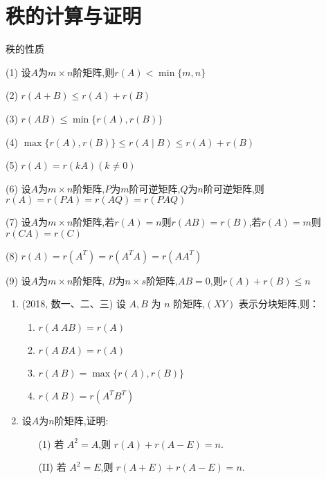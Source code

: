 \documentclass[12pt, a4paper, oneside, UTF8]{ctexbook}
\begin{document}
\section{秩的计算与证明}
\begin{remark}
    秩的性质
    \item[(1)] 设$A$为$m\times n$阶矩阵,则$r(A)<\min\{m,n\}$
    \item[(2)] $r(A+B)\leq r(A)+r(B)$
    \item[(3)] $r(AB)\leq\min\{r(A),r(B)\}$
    \item[(4)] $\max\{r(A),r(B)\}\leq r(A\mid B)\leq r(A) + r(B)$
    \item[(5)] $r(A)=r(kA)(k\neq 0)$
    \item[(6)] 设$A$为$m\times n$阶矩阵,$P$为$m$阶可逆矩阵,$Q$为$n$阶可逆矩阵,则
    $r(A)=r(PA)=r(AQ)=r(PAQ)$
    \item[(7)] 设$A$为$m\times n$阶矩阵,若$r(A)=n$则$r(AB)=r(B)$,若$r(A)=m$则$r(CA)=r(C)$
    \item[(8)] $r(A)=r(A^T)=r(A^TA)=r(AA^T)$
    \item[(9)] 设$A$为$m\times n$阶矩阵, $B$为$n\times s$阶矩阵,$AB=0$,则$r(A)+r(B)\leq n$
\end{remark}
\begin{enumerate}[label=\arabic*.,start=7]
    \item (2018, 数一、二、三) 设 $ A, B $ 为 $ n $ 阶矩阵,$ (XY) $ 表示分块矩阵,则：
    \begin{enumerate}
        \item $ r(A\ AB) = r(A) $
        \item $ r(A\ BA) = r(A) $
        \item $ r(A\ B) = \max\{r(A), r(B)\} $
        \item $ r(A\ B) = r(A^T B^T) $
    \end{enumerate}
    
    \begin{solution}
    \newpage
    \end{solution}
    \item 设$A$为$n$阶矩阵,证明:
    \begin{enumerate}
        \item [(1)] 若 $ A^2 = A $,则 $ r(A) + r(A - E) = n $.
        \item [(II)] 若 $ A^2 = E $,则 $ r(A + E) + r(A - E) = n $.
    \end{enumerate}
    
    \begin{solution}
    \newpage
    \end{solution}
\end{enumerate}
\end{document}
